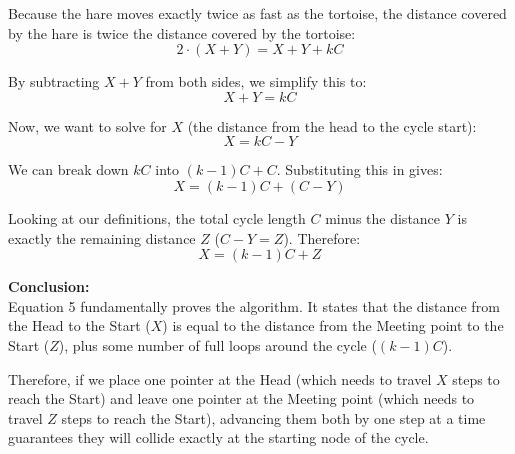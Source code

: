 \documentclass[12pt, letterpaper]{article}
\begin{document}
Because the hare moves exactly twice as fast as the tortoise, the distance covered by the hare is twice the distance covered by the tortoise:
\begin{equation}
2 \cdot (X + Y) = X + Y + kC
\end{equation}

By subtracting $X + Y$ from both sides, we simplify this to:
\begin{equation}
X + Y = kC
\end{equation}

Now, we want to solve for $X$ (the distance from the head to the cycle start):
\begin{equation}
X = kC - Y
\end{equation}

We can break down $kC$ into $(k-1)C + C$. Substituting this in gives:
\begin{equation}
X = (k - 1)C + (C - Y)
\end{equation}

Looking at our definitions, the total cycle length $C$ minus the distance $Y$ is exactly the remaining distance $Z$ ($C - Y = Z$). Therefore:
\begin{equation}
X = (k - 1)C + Z
\end{equation}

\textbf{Conclusion:}\\
Equation 5 fundamentally proves the algorithm. It states that the distance from the Head to the Start ($X$) is equal to the distance from the Meeting point to the Start ($Z$), plus some number of full loops around the cycle ($(k - 1)C$). 

Therefore, if we place one pointer at the Head (which needs to travel $X$ steps to reach the Start) and leave one pointer at the Meeting point (which needs to travel $Z$ steps to reach the Start), advancing them both by one step at a time guarantees they will collide exactly at the starting node of the cycle.
\end{document}
